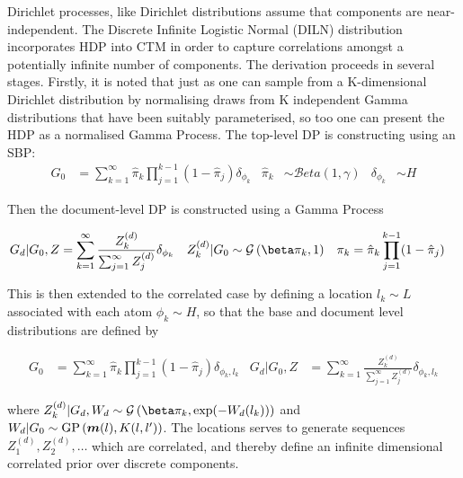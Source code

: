 Dirichlet processes, like Dirichlet distributions assume that components are near-independent. The Discrete Infinite Logistic Normal (DILN) distribution\cite{Paisley2012} incorporates HDP into CTM in order to capture correlations amongst a potentially infinite number of components. The derivation proceeds in several stages. Firstly, it is noted that just as one can sample from a K-dimensional Dirichlet distribution by normalising draws from K independent Gamma distributions that have been suitably parameterised, so too one can present the HDP as a normalised Gamma Process. The top-level DP is constructing using an SBP:
\begin{align}
G_0 & = \sum_{k=1}^\infty \hat{\pi}_k \prod_{j=1}^{k-1} (1 - \hat{\pi}_j)\delta_{\phi_k} & 
\hat{\pi}_k & \sim \mathcal{B}eta\left(1, \gamma\right) &
\delta_{\phi_k} & \sim H
\end{align}

Then the document-level DP is constructed using a Gamma Process

\begin{align}
G_d|G_0, Z & = \sum_{k=1}^\infty \frac{Z_k^{(d)}}{\sum_{j=1}^\infty Z_j^{(d)}} \delta_{\phi_k} &
Z_k^{(d)} | G_0 &\sim \gam{\beta \pi_k}{1} &
\pi_k & = \hat{\pi}_k \prod_{j=1}^{k-1} (1 - \hat{\pi}_j)
\end{align}

This is then extended to the correlated case by defining a location $l_k \sim L$ associated with each atom $\phi_k \sim H$, so that the base and document level distributions are defined by

\begin{align}
G_0 & = \sum_{k=1}^\infty \hat{\pi}_k \prod_{j=1}^{k-1} (1 - \hat{\pi}_j)\delta_{\phi_k,l_k} &
G_d|G_0, Z & = \sum_{k=1}^\infty \frac{Z_k^{(d)}}{\sum_{j=1}^\infty Z_j^{(d)}} \delta_{\phi_k, l_k}
\end{align}

where $Z_k^{(d)} | G_d, W_d \sim \gam{\beta \pi_k}{\exp(-W_d(l_k))}$ and $W_d | G_0 \sim \text{GP}\left(\bm m(l), K(l, l')\right)$. The locations serves to generate sequences $Z_1^{(d)}, Z_2^{(d)},\ldots$ which are correlated, and thereby define an infinite dimensional correlated prior over discrete components.





